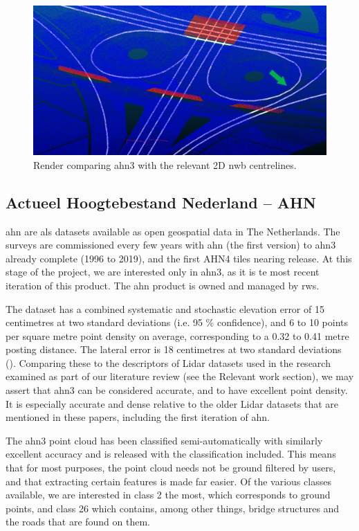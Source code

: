 \begin{figure}
    \centering
    \includegraphics[width=\linewidth]{final_report/figs/ahn_sample_04_a.png} 
    \caption{Render comparing \ac{ahn3} with the relevant 2D \ac{nwb} centrelines.}
    \label{fig:ahnnwb}
\end{figure}

\subsection{Actueel Hoogtebestand Nederland – AHN}
\label{sub:ahn}

\ac{ahn} are \ac{als} datasets available as open geospatial data in The Netherlands. The surveys are commissioned every few years with \ac{ahn} (the first version) to \ac{ahn3} already complete (1996 to 2019), and the first AHN4 tiles nearing release. At this stage of the project, we are interested only in \ac{ahn3}, as it is te most recent iteration of this product. The \ac{ahn} product is owned and managed by \ac{rws}.

The dataset has a combined systematic and stochastic elevation error of 15 centimetres at two standard deviations (i.e. 95 \% confidence), and 6 to 10 points per square metre point density on average, corresponding to a 0.32 to 0.41 metre posting distance. The lateral error is 18 centimetres at two standard deviations (\cite{ahn_kwaliteit}). Comparing these to the descriptors of Lidar datasets used in the research examined as part of our literature review (see the Relevant work section), we may assert that \ac{ahn3} can be considered accurate, and to have excellent point density. It is especially accurate and dense relative to the older Lidar datasets that are mentioned in these papers, including the first iteration of \ac{ahn}.

The \ac{ahn3} point cloud has been classified semi-automatically with similarly excellent accuracy and is released with the classification included. This means that for most purposes, the point cloud needs not be ground filtered by users, and that extracting certain features is made far easier. Of the various classes available, we are interested in class 2 the most, which corresponds to ground points, and class 26 which contains, among other things, bridge structures and the roads that are found on them.

